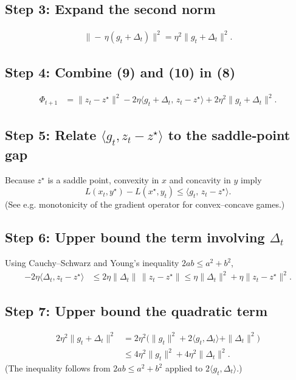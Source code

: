 \documentclass{article}
\begin{document}
\subsection*{Step 3: Expand the second norm}
\begin{align}
\|-\,\eta(g_{t}+\Delta_{t})\|^{2}= \eta^{2}\|g_{t}+\Delta_{t}\|^{2}. \tag{10}
\end{align}

\subsection*{Step 4: Combine (9) and (10) in (8)}
\begin{align}
\Phi_{t+1}
&= \|z_{t}-z^{\star}\|^{2}
   -2\eta\langle g_{t}+\Delta_{t},\,z_{t}-z^{\star}\rangle
   +2\eta^{2}\|g_{t}+\Delta_{t}\|^{2}. \tag{11}
\end{align}

\subsection*{Step 5: Relate $\langle g_{t},z_{t}-z^{\star}\rangle$ to the saddle‑point gap}
Because $z^{\star}$ is a saddle point, convexity in $x$ and concavity in $y$ imply
\[
L(x_{t},y^{\star})-L(x^{\star},y_{t})\le\langle g_{t},\,z_{t}-z^{\star}\rangle.
\tag{12}
\]
(See e.g. monotonicity of the gradient operator for convex–concave games.)

\subsection*{Step 6: Upper bound the term involving $\Delta_{t}$}
Using Cauchy–Schwarz and Young’s inequality $2ab\le a^{2}+b^{2}$,
\begin{align}
-2\eta\langle \Delta_{t},z_{t}-z^{\star}\rangle
&\le 2\eta\|\Delta_{t}\|\,\|z_{t}-z^{\star}\|
   \le \eta\|\Delta_{t}\|^{2}+\eta\|z_{t}-z^{\star}\|^{2}. \tag{13}
\end{align}

\subsection*{Step 7: Upper bound the quadratic term}
\begin{align}
2\eta^{2}\|g_{t}+\Delta_{t}\|^{2}
&=2\eta^{2}\bigl(\|g_{t}\|^{2}+2\langle g_{t},\Delta_{t}\rangle+\|\Delta_{t}\|^{2}\bigr)\\
&\le 4\eta^{2}\|g_{t}\|^{2}+4\eta^{2}\|\Delta_{t}\|^{2}. \tag{14}
\end{align}
(The inequality follows from $2ab\le a^{2}+b^{2}$ applied to $2\langle g_{t},\Delta_{t}\rangle$.)
\end{document}

